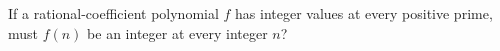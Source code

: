 If a rational-coefficient polynomial $f$ has integer values at every positive prime, must $f(n)$ be an integer at every integer $n$?
